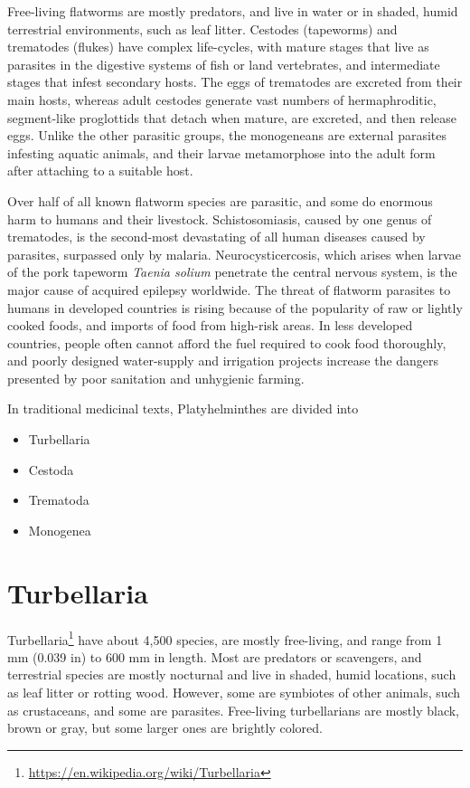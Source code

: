 \documentclass[]{book}
\providecommand{\tightlist}{%
  \setlength{\itemsep}{0pt}\setlength{\parskip}{0pt}}
\let\rmarkdownfootnote\footnote%
\def\footnote{\protect\rmarkdownfootnote}
\renewcommand{\href}[2]{#2\footnote{\url{#1}}}
\theoremstyle{definition}
\theoremstyle{definition}
\theoremstyle{definition}
\theoremstyle{remark}
\begin{document}
Free-living flatworms are mostly predators, and live in water or in
shaded, humid terrestrial environments, such as leaf litter. Cestodes
(tapeworms) and trematodes (flukes) have complex life-cycles, with
mature stages that live as parasites in the digestive systems of fish or
land vertebrates, and intermediate stages that infest secondary hosts.
The eggs of trematodes are excreted from their main hosts, whereas adult
cestodes generate vast numbers of hermaphroditic, segment-like
proglottids that detach when mature, are excreted, and then release
eggs. Unlike the other parasitic groups, the monogeneans are external
parasites infesting aquatic animals, and their larvae metamorphose into
the adult form after attaching to a suitable host.

Over half of all known flatworm species are parasitic, and some do
enormous harm to humans and their livestock. Schistosomiasis, caused by
one genus of trematodes, is the second-most devastating of all human
diseases caused by parasites, surpassed only by malaria.
Neurocysticercosis, which arises when larvae of the pork tapeworm \emph{Taenia
solium} penetrate the central nervous system, is the major cause of
acquired epilepsy worldwide. The threat of flatworm parasites to humans
in developed countries is rising because of the popularity of raw or
lightly cooked foods, and imports of food from high-risk areas. In less
developed countries, people often cannot afford the fuel required to
cook food thoroughly, and poorly designed water-supply and irrigation
projects increase the dangers presented by poor sanitation and
unhygienic farming.

In traditional medicinal texts, Platyhelminthes are divided into

\begin{itemize}
\tightlist
\item
  Turbellaria
\item
  Cestoda
\item
  Trematoda
\item
  Monogenea
\end{itemize}

\section{Turbellaria}\label{turbellaria}

\href{https://en.wikipedia.org/wiki/Turbellaria}{Turbellaria} have about
4,500 species, are mostly free-living, and range from 1 mm (0.039 in) to
600 mm in length. Most are predators or scavengers, and terrestrial
species are mostly nocturnal and live in shaded, humid locations, such
as leaf litter or rotting wood. However, some are symbiotes of other
animals, such as crustaceans, and some are parasites. Free-living
turbellarians are mostly black, brown or gray, but some larger ones are
brightly colored.
\end{document}
